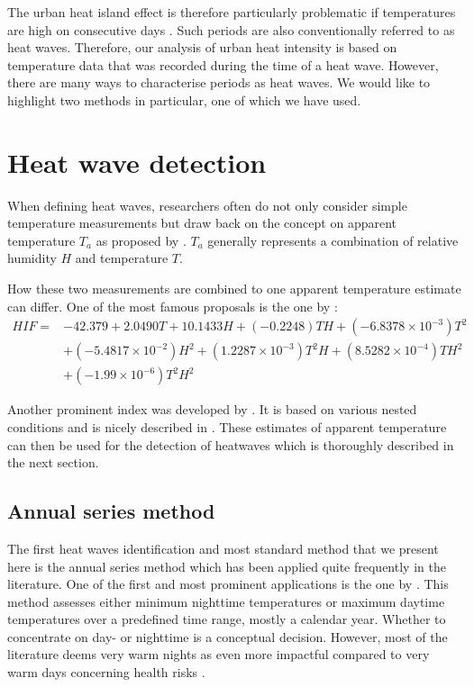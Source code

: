\documentclass[12pt]{article}
\begin{document}
The urban heat island effect is therefore particularly problematic if temperatures are high on consecutive days \citep{gasparrini2011}. Such periods are also conventionally referred to as heat waves. Therefore, our analysis of urban heat intensity is based on temperature data that was recorded during the time of a heat wave. However, there are many ways to characterise periods as heat waves. We would like to highlight two methods in particular, one of which we have used.


\section{Heat wave detection}

When defining heat waves, researchers often do not only consider simple temperature measurements but draw back on the concept on apparent temperature $T_a$ as proposed by \citet{steadman1984}. $T_a$ generally represents a combination of relative humidity $H$ and temperature $T$.

How these two measurements are combined to one apparent temperature estimate can differ. One of the most famous proposals is the one by \citet{el2007}:
\begin{equation}
\begin{aligned}
HIF = & -42.379 + 2.0490T + 10.1433H + (-0.2248)TH + (-6.8378 \times 10^{-3})T^2 \\
& + (-5.4817 \times 10^{-2})H^2 + (1.2287 \times 10^{-3})T^2H + (8.5282 \times 10^{-4})TH^2 \\
& + (-1.99 \times 10^{-6})T^2H^2
\end{aligned}
\end{equation}

Another prominent index was developed by \citet{nws2011}. It is based on various nested conditions and is nicely described in \citet{anderson2013}. These estimates of apparent temperature can then be used for the detection of heatwaves which is thoroughly described in the next section.

\subsection{Annual series method}

The first heat waves identification and most standard method that we present here is the annual series method which has been applied quite frequently in the literature. One of the first and most prominent applications is the one by \citet{karl1997}. This method assesses either minimum nighttime temperatures or maximum daytime temperatures over a predefined time range, mostly a calendar year. Whether to concentrate on day- or nighttime is a conceptual decision. However, most of the literature deems very warm nights as even more impactful compared to very warm days concerning health risks \citep{mcmichael1996,henschel1969}. 
\end{document}
